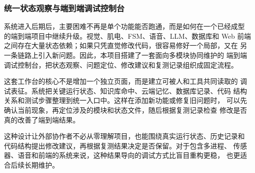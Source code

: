 \subsubsection{统一状态观察与端到端调试控制台}

系统进入后期后，主要困难不再是单个功能能否跑通，而是如何在一个已经成型
的端到端项目中继续升级。视觉、肌电、FSM、语音、LLM、数据库和 Web 前端
之间存在大量状态依赖；如果只凭直觉修改代码，很容易修好一个局部，又在
另一条链路上引入新问题。因此，本项目搭建了一套面向多模块协同维护的
端到端调试控制台，把状态观察、问题定位、修改建议和复测记录组织成固定流程。

这套工作台的核心不是增加一个独立页面，而是建立可被人和工具共同读取的
调试表征。系统把关键运行状态、知识库命中、云端记忆、数据库记录、代码
结构关系和测试步骤整理到统一入口中。这样在添加新功能或修复旧问题时，
可以先确认当前现象，再定位涉及的模块和状态文件，随后根据复测记录检查
修改是否真的改善了端到端结果。

这种设计让外部协作者不必从零理解项目，也能围绕真实运行状态、历史记录和
代码结构提出修改建议，再根据复测结果决定是否保留。对于包含多进程、
传感器、语音和前端的系统来说，这种结果导向的调试方式比盲目重构更稳，
也更适合后续长期维护。

